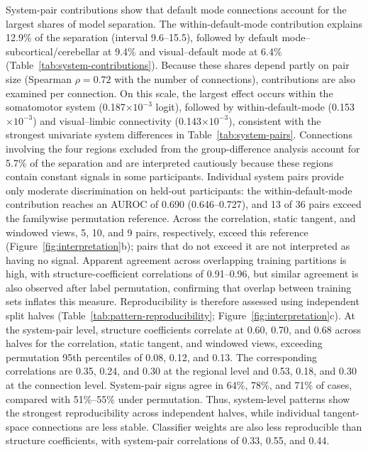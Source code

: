 System-pair contributions show that default mode connections account for the largest shares of model separation. The within-default-mode contribution explains 12.9\% of the separation (interval 9.6--15.5), followed by default mode--subcortical/cerebellar at 9.4\% and visual--default mode at 6.4\% (Table~\ref{tab:system-contributions}). Because these shares depend partly on pair size (Spearman $\rho=0.72$ with the number of connections), contributions are also examined per connection. On this scale, the largest effect occurs within the somatomotor system (0.187$\times10^{-3}$ logit), followed by within-default-mode (0.153$\times10^{-3}$) and visual--limbic connectivity (0.143$\times10^{-3}$), consistent with the strongest univariate system differences in Table~\ref{tab:system-pairs}. Connections involving the four regions excluded from the group-difference analysis account for 5.7\% of the separation and are interpreted cautiously because these regions contain constant signals in some participants. Individual system pairs provide only moderate discrimination on held-out participants: the within-default-mode contribution reaches an AUROC of 0.690 (0.646--0.727), and 13 of 36 pairs exceed the familywise permutation reference. Across the correlation, static tangent, and windowed views, 5, 10, and 9 pairs, respectively, exceed this reference (Figure~\ref{fig:interpretation}b); pairs that do not exceed it are not interpreted as having no signal. Apparent agreement across overlapping training partitions is high, with structure-coefficient correlations of 0.91--0.96, but similar agreement is also observed after label permutation, confirming that overlap between training sets inflates this measure. Reproducibility is therefore assessed using independent split halves (Table~\ref{tab:pattern-reproducibility}; Figure~\ref{fig:interpretation}c). At the system-pair level, structure coefficients correlate at 0.60, 0.70, and 0.68 across halves for the correlation, static tangent, and windowed views, exceeding permutation 95th percentiles of 0.08, 0.12, and 0.13. The corresponding correlations are 0.35, 0.24, and 0.30 at the regional level and 0.53, 0.18, and 0.30 at the connection level. System-pair signs agree in 64\%, 78\%, and 71\% of cases, compared with 51\%--55\% under permutation. Thus, system-level patterns show the strongest reproducibility across independent halves, while individual tangent-space connections are less stable. Classifier weights are also less reproducible than structure coefficients, with system-pair correlations of 0.33, 0.55, and 0.44.


